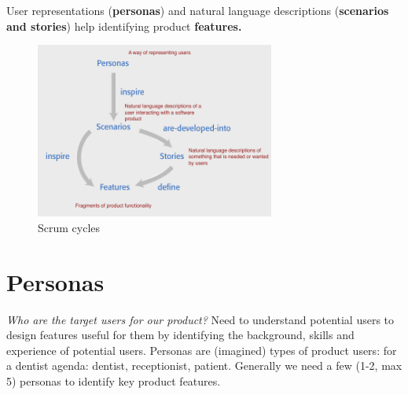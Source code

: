 \documentclass[10pt,a4paper]{report}
\begin{document}
User representations (\textbf{personas}) and natural language descriptions (\textbf{scenarios and stories}) help identifying product \textbf{features.}
\begin{figure}[h]
	\centering
	\includegraphics[width=0.7\textwidth]{image16}
	\caption{Scrum cycles}
	\label{image16}
\end{figure}

\section{Personas}
\textit{Who are the target users for our product?}
Need to understand potential users to design features useful for them by identifying the background, skills and experience of potential users.
Personas are (imagined) types of product users: for a dentist agenda: dentist, receptionist, patient.
Generally we need a few (1-2, max 5) personas to identify key product features.
\end{document}
